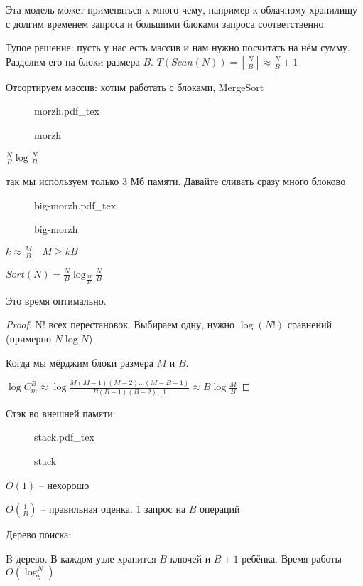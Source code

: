 \documentclass{book}
\theoremstyle{definition}
\newcommand{\incfig}[1]{%
    \def\svgwidth{\columnwidth}
    {#1.pdf_tex}
}
\begin{document}
Эта модель может применяться к много чему, например к облачному хранилищу с долгим временем запроса и большими блоками запроса соответственно.

Тупое решение: пусть у нас есть массив и нам нужно посчитать на нём сумму. Разделим его на блоки размера $B$.  $T(Scan(N)) = \left\lceil \frac{N}{B} \right\rceil \approx \frac{N}{B} + 1 $ 

Отсортируем массив: хотим работать с блоками, MergeSort


\begin{figure}[!ht]
    \centering
    \incfig{morzh}
    \caption{morzh}
    \label{fig:morzh}
\end{figure}

$\frac{N}{B} \log \frac{N}{B}$ 

так мы используем только 3 Мб памяти. Давайте сливать сразу много блоково


\begin{figure}[!ht]
    \centering
    \incfig{big-morzh}
    \caption{big-morzh}
    \label{fig:big-morzh}
\end{figure}

$k \approx \frac{M}{B} \quad M \geqslant kB$ 

$Sort(N) = \frac{N}{B} \log _{\frac{M}{B}} \frac{N}{B}$ 


\begin{statement}
    Это время оптимально.
\end{statement}
\begin{proof}
    N! всех перестановок. Выбираем одну, нужно $\log \left( N! \right) $ сравнений (примерно $N\log N$)

    Когда мы мёрджим блоки размера  $M$ и $B$. 

    $\log  C_m^B \approx \log \frac{M(M-1)(M-2)\ldots (M-B+1)}{B (B-1)(B-2) \ldots 1} \approx B \log \frac{M}{B}$
\end{proof}



Стэк во внешней памяти: 

\begin{figure}[!ht]
    \centering
    \incfig{stack}
    \caption{stack}
    \label{fig:stack}
\end{figure}

$O(1)$ -- нехорошо

$O(\frac{1}{B})$ -- правильная оценка. 1 запрос на $B$ операций

Дерево поиска:


B-дерево. В каждом узле хранится  $B$ ключей и  $B+1$ ребёнка. Время работы $O\left( \log _b^N \right) $ 
\end{document}
